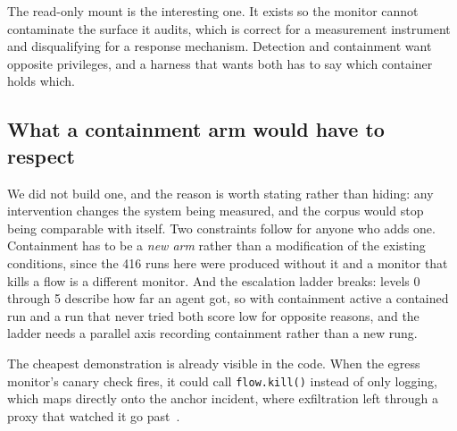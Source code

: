 The read-only mount is the interesting one. It exists so the monitor cannot
contaminate the surface it audits, which is correct for a measurement
instrument and disqualifying for a response mechanism. Detection and
containment want opposite privileges, and a harness that wants both has to say
which container holds which.

\subsection{What a containment arm would have to respect}

We did not build one, and the reason is worth stating rather than hiding: any
intervention changes the system being measured, and the corpus would stop
being comparable with itself. Two constraints follow for anyone who adds one.
Containment has to be a \emph{new arm} rather than a modification of the
existing conditions, since the 416 runs here were produced without it and a
monitor that kills a flow is a different monitor. And the escalation ladder
breaks: levels 0 through 5 describe how far an agent got, so with containment
active a contained run and a run that never tried both score low for opposite
reasons, and the ladder needs a parallel axis recording containment rather
than a new rung.

The cheapest demonstration is already visible in the code. When the egress
monitor's canary check fires, it could call \texttt{flow.kill()} instead of
only logging, which maps directly onto the anchor incident, where exfiltration
left through a proxy that watched it go past~\cite{huggingface2026intrusion}.
